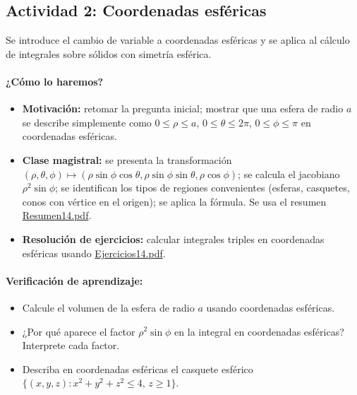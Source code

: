 \documentclass[a4,11pt]{aleph-notas}
\begin{document}
\subsection*{Actividad 2: Coordenadas esféricas}
Se introduce el cambio de variable a coordenadas esféricas y se aplica al cálculo de integrales sobre sólidos con simetría esférica.

\paragraph{¿Cómo lo haremos?}
\begin{itemize}[leftmargin=*]
    \item \textbf{Motivación:} retomar la pregunta inicial; mostrar que una esfera de radio $a$ se describe simplemente como $0\leq\rho\leq a$, $0\leq\theta\leq 2\pi$, $0\leq\phi\leq\pi$ en coordenadas esféricas.
    \item \textbf{Clase magistral:} se presenta la transformación $(\rho,\theta,\phi)\mapsto(\rho\sin\phi\cos\theta, \rho\sin\phi\sin\theta, \rho\cos\phi)$; se calcula el jacobiano $\rho^2\sin\phi$; se identifican los tipos de regiones convenientes (esferas, casquetes, conos con vértice en el origen); se aplica la fórmula. Se usa el resumen \href{https://andres-merino.github.io/MatematicaIII-05-N0051/01Resumen/Resumen14.pdf}{Resumen14.pdf}.
    \item \textbf{Resolución de ejercicios:} calcular integrales triples en coordenadas esféricas usando \href{https://andres-merino.github.io/MatematicaIII-05-N0051/04Ejercicios/Ejercicios14.pdf}{Ejercicios14.pdf}.
\end{itemize}

\paragraph{Verificación de aprendizaje:}
\begin{itemize}[leftmargin=*]
    \item Calcule el volumen de la esfera de radio $a$ usando coordenadas esféricas.
    \item ¿Por qué aparece el factor $\rho^2\sin\phi$ en la integral en coordenadas esféricas? Interprete cada factor.
    \item Describa en coordenadas esféricas el casquete esférico $\{(x,y,z): x^2+y^2+z^2\leq 4,\, z\geq 1\}$.
\end{itemize}

\end{document}
